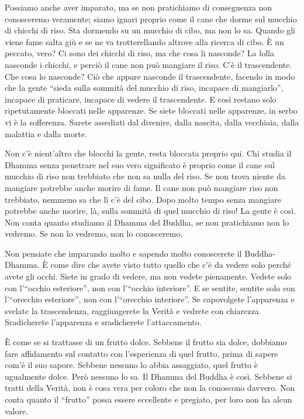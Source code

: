 Possiamo anche aver imparato, ma se non pratichiamo di conseguenza non
conosceremo veramente; siamo ignari proprio come il cane che dorme sul
mucchio di chicchi di riso. Sta dormendo su un mucchio di cibo, ma non
lo sa. Quando gli viene fame salta giù e se ne va trotterellando altrove
alla ricerca di cibo. È un peccato, vero? Ci sono dei chicchi di riso,
ma che cosa li nasconde? La lolla nasconde i chicchi, e perciò il cane
non può mangiare il riso. C'è il trascendente. Che cosa lo nasconde? Ciò
che appare nasconde il trascendente, facendo in modo che la gente
``sieda sulla sommità del mucchio di riso, incapace di mangiarlo'',
incapace di praticare, incapace di vedere il trascendente. E così
restano solo ripetutamente bloccati nelle apparenze. Se siete bloccati
nelle apparenze, in serbo vi è la sofferenza. Sarete assediati dal
divenire, dalla nascita, dalla vecchiaia, dalla malattia e dalla morte.

Non c'è nient'altro che blocchi la gente, resta bloccata proprio qui.
Chi studia il Dhamma senza penetrare nel suo vero significato è proprio
come il cane sul mucchio di riso non trebbiato che non sa nulla del
riso. Se non trova niente da mangiare potrebbe anche morire di fame. Il
cane non può mangiare riso non trebbiato, nemmeno sa che lì c'è del
cibo. Dopo molto tempo senza mangiare potrebbe anche morire, là, sulla
sommità di quel mucchio di riso! La gente è così. Non conta quanto
studiamo il Dhamma del Buddha, se non pratichiamo non lo vedremo. Se non
lo vedremo, non lo conosceremo.

Non pensiate che imparando molto e sapendo molto conoscerete il
Buddha-Dhamma. È come dire che avete visto tutto quello che c'è da
vedere solo perché avete gli occhi. Siete in grado di vedere, ma non
vedete pienamente. Vedete solo con l'``occhio esteriore'', non con
l'``occhio interiore''. E se sentite, sentite solo con l'``orecchio
esteriore'', non con l'``orecchio interiore''. Se capovolgete
l'apparenza e svelate la trascendenza, raggiungerete la Verità e vedrete
con chiarezza. Sradicherete l'apparenza e sradicherete l'attaccamento.

È come se si trattasse di un frutto dolce. Sebbene il frutto sia dolce,
dobbiamo fare affidamento sul contatto con l'esperienza di quel frutto,
prima di sapere com'è il suo sapore. Sebbene nessuno lo abbia
assaggiato, quel frutto è ugualmente dolce. Però nessuno lo sa. Il
Dhamma del Buddha è così. Sebbene si tratti della Verità, non è cosa
vera per coloro che non la conoscono davvero. Non conta quanto il
``frutto'' possa essere eccellente e pregiato, per loro non ha alcun
valore.

